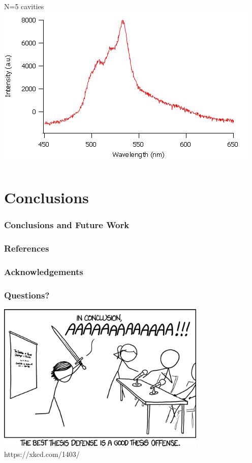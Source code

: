\documentclass{beamer}
\begin{document}
\begin{frame}
\begin{columns}
\begin{column}{0.5\textwidth}
					N=5 cavities\\
					\includegraphics[width=\textwidth]{images/n5_fe.png}
				\end{column}
            \end{columns}
        \end{frame}
        
\section{Conclusions}
    \frame{\tableofcontents[currentsection]}
    \begin{frame}
        \frametitle{Conclusions and Future Work}
    \end{frame}
    
    \begin{frame}
        \frametitle{References}
    \end{frame}
    
    \begin{frame}
        \frametitle{Acknowledgements}
    \end{frame}
    
    \begin{frame}
        \frametitle{Questions?}
        \centering
        \includegraphics[width=0.75\textwidth]{images/xkcd.png}\\
        \tiny https://xkcd.com/1403/
    \end{frame}
    
\end{document}
